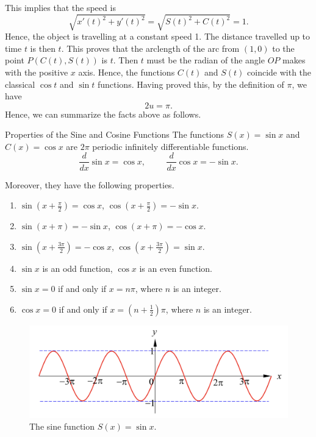 This implies that the speed is
\[\sqrt{x'(t)^2+y'(t)^2}=\sqrt{S(t)^2+C(t)^2}=1.\]
Hence, the object is travelling at a constant speed 1. The distance travelled up to time $t$ is then $t$. This proves that the arclength of the arc from $(1,0)$ to the point $P(C(t), S(t))$ is $t$. Then $t$ must be the radian of the angle $OP$ makes with the positive $x$ axis. Hence, the functions $C(t)$ and $S(t)$ coincide with the classical $\cos t$ and $\sin t$ functions. Having proved this, by the definition of $\pi$, we have
\[2u=\pi.\]
Hence, we can summarize the facts above as follows.
\begin{highlight}{Properties of the Sine and Cosine Functions}
The functions $S(x)=\sin x$ and $C(x)=\cos x$ are $2\pi$ periodic infinitely differentiable functions. 
\[\frac{d}{dx}\sin x=\cos x,\hspace{1cm}\frac{d}{dx}\cos x=-\sin x.\]

Moreover, they have the following properties.
\begin{enumerate}[1.]
\item $\sin\left(x+\frac{\pi}{2}\right)=\cos x$, $\cos\left(x+\frac{\pi}{2}\right)=-\sin x$.
\item $\sin\left(x+\pi\right)=-\sin x$, $\cos\left(x+\pi \right)=-\cos x$.
\item $\sin\left(x+\frac{3\pi}{2}\right)=-\cos x$, $\cos\left(x+\frac{3\pi}{2}\right)=\sin x$.
\item $\sin x$ is an odd function, $\cos x$ is an even function.
\item $\sin x=0$ if and  only if $x=n\pi$, where $n$ is an integer.
\item $\cos x=0$ if and only if $x=\left(n+\frac{1}{2}\right)\pi$,  where $n$ is an integer.
\end{enumerate}
\end{highlight}


\begin{figure}[ht]
\centering
\includegraphics[scale=0.2]{Picture32.png}
\caption{The sine function $S(x)=\sin x$.\fa}\label{figure32}
\end{figure}



